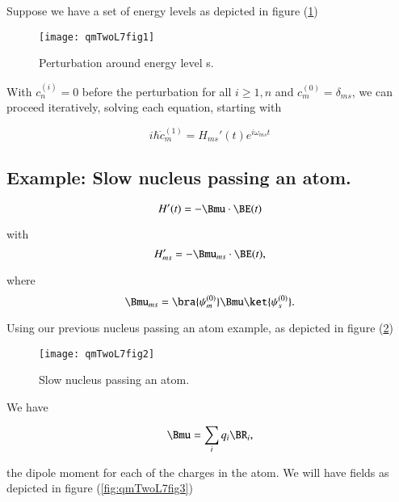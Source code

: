 Suppose we have a set of energy levels as depicted in figure (\ref{fig:qmTwoL7fig1})

\begin{figure}[htp]
\centering
\texttt{[image: qmTwoL7fig1]}
\caption{Perturbation around energy level s.}\label{fig:qmTwoL7fig1}
\end{figure}

With $c_n^{(i)} = 0$ before the perturbation for all $i \ge 1, n$ and $c_m^{(0)} = \delta_{ms}$, we can proceed iteratively, solving each equation, starting with

\begin{equation}\label{eqn:qmTwoL7:490}
i \hbar \dot{c}_m^{(1)} = H_{ms}'(t) e^{i \omega_{ms} t}
\end{equation}

\subsection{Example: Slow nucleus passing an atom.}

\begin{equation}\label{eqn:qmTwoL7:510}
H'(t) = - \Bmu \cdot \BE(t)
\end{equation}

with
\begin{equation}\label{eqn:qmTwoL7:530}
H_{ms}' = -\Bmu_{ms} \cdot \BE(t),
\end{equation}

where
\begin{equation}\label{eqn:qmTwoL7:550}
\Bmu_{ms} =
\bra{\psi_m^{(0)}}
\Bmu
\ket{\psi_s^{(0)}}.
\end{equation}

Using our previous nucleus passing an atom example, as depicted in figure (\ref{fig:qmTwoL7fig2})

\begin{figure}[htp]
\centering
\texttt{[image: qmTwoL7fig2]}
\caption{Slow nucleus passing an atom.}\label{fig:qmTwoL7fig2}
\end{figure}

We have

\begin{equation}\label{eqn:qmTwoL7:570}
\Bmu = \sum_i q_i \BR_i,
\end{equation}

the dipole moment for each of the charges in the atom.  We will have fields as depicted in figure (\ref{fig:qmTwoL7fig3})

